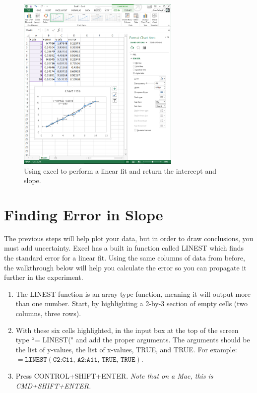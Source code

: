 \documentclass[letterpaper, 12pt]{book}
\begin{document}
\begin{figure}[h!]
\centering
\includegraphics[height=0.4\textheight, width = 0.7\textwidth]{./pic/image6.png}
\caption{Using excel to perform a linear fit and return the intercept and slope.}
\label{fig:excel3}
\end{figure}

\section{Finding Error in Slope}
\label{sec:linest}

The previous steps will help plot your data, but in order to draw conclusions, you must add uncertainty. Excel has a built in function called LINEST which finds the standard error for a linear fit. Using the same columns of data from before, the walkthrough below will help you calculate the error so you can propagate it further in the experiment.

\begin{enumerate}
\item The LINEST function is an array-type function, meaning it will output more than one number. Start, by highlighting a 2-by-3 section of empty cells (two columns, three rows).
\item With these six cells highlighted, in the input box at the top of the screen type ``= LINEST(" and add the proper arguments. The arguments should be the list of y-values, the list of x-values, TRUE, and TRUE.
For example:
$=\texttt{LINEST}(\texttt{C2:C11, A2:A11, TRUE, TRUE})$.

\item Press CONTROL+SHIFT+ENTER. \it{Note that on a Mac, this is CMD+SHIFT+ENTER.}
\end{enumerate}
\end{document}
